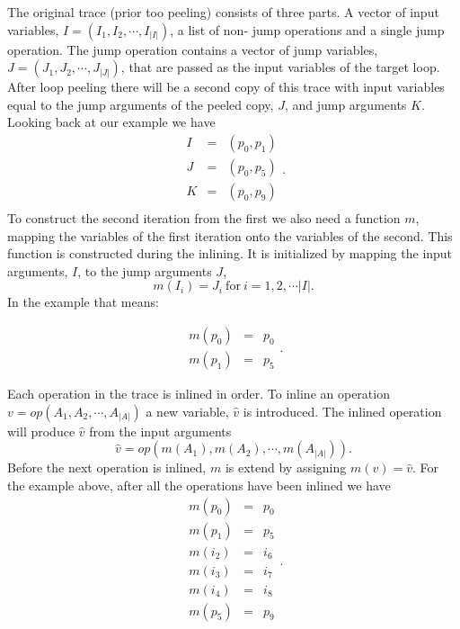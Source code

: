 \documentclass[preprint]{sigplanconf}
\begin{document}
The original trace (prior too peeling) consists of three parts. 
A vector of input
variables, $I=\left(I_1, I_2, \cdots, I_{|I|}\right)$, a list of non-
jump operations and a single
jump operation. The jump operation contains a vector of jump variables,
$J=\left(J_1, J_2, \cdots, J_{|J|}\right)$, that are passed as the input variables of the target loop. After
loop peeling there will be a second copy of this trace with input
variables equal to the jump arguments of the peeled copy, $J$, and jump
arguments $K$. Looking back at our example we have
\begin{equation}
    \begin{array}{lcl}
      I &=& \left( p_0, p_1 \right) \\
      J &=& \left( p_0, p_5 \right) \\
      K &=& \left( p_0, p_9 \right) \\
    \end{array}
  .
\end{equation}
To construct the second iteration from the first we also need a
function $m$, mapping the variables of the first iteration onto the
variables of the second. This function is constructed during the
inlining. It is initialized by mapping the input arguments, $I$, to
the jump arguments $J$,
\begin{equation}
  m\left(I_i\right) = J_i \ \text{for}\ i = 1, 2, \cdots |I| .
\end{equation}
In the example that means:

\begin{equation}
    \begin{array}{lcl}
      m\left(p_0\right) &=& p_0 \\
      m\left(p_1\right) &=& p_5
    \end{array}
  .
\end{equation}

Each operation in the trace is inlined in order.
To inline an operation $v=op\left(A_1, A_2, \cdots, A_{|A|}\right)$
a new variable, $\hat v$ is introduced. The inlined operation will
produce $\hat v$ from the input arguments 
\begin{equation}
  \hat v = op\left(m\left(A_1\right), m\left(A_2\right), 
    \cdots, m\left(A_{|A|}\right)\right) . 
\end{equation}
Before the
next operation is inlined, $m$ is extend by assigning $m\left(v\right) = \hat
v$. For the example above, after all the operations have been inlined we have
\begin{equation}
    \begin{array}{lcl}
      m\left(p_0\right) &=& p_0 \\
      m\left(p_1\right) &=& p_5 \\
      m\left(i_2\right) &=& i_6 \\
      m\left(i_3\right) &=& i_7 \\
      m\left(i_4\right) &=& i_8 \\
      m\left(p_5\right) &=& p_9 \\
    \end{array}
  .
\end{equation}
\end{document}
